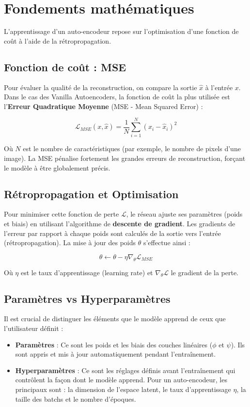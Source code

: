 \documentclass[11pt,a4paper]{report}
\begin{document}
\section{Fondements mathématiques}

L'apprentissage d'un auto-encodeur repose sur l'optimisation d'une fonction de coût à l'aide de la rétropropagation.

\subsection{Fonction de coût : MSE}
Pour évaluer la qualité de la reconstruction, on compare la sortie $\hat{x}$ à l'entrée $x$. Dans le cas des Vanilla Autoencoders, la fonction de coût la plus utilisée est l'\textbf{Erreur Quadratique Moyenne} (MSE - Mean Squared Error) :

\begin{equation} \label{eq:mse_def}
    \mathcal{L}_{MSE}(x, \hat{x}) = \frac{1}{N} \sum_{i=1}^{N} (x_i - \hat{x}_i)^2
\end{equation}

Où $N$ est le nombre de caractéristiques (par exemple, le nombre de pixels d'une image). La MSE pénalise fortement les grandes erreurs de reconstruction, forçant le modèle à être globalement précis.

\subsection{Rétropropagation et Optimisation}
Pour minimiser cette fonction de perte $\mathcal{L}$, le réseau ajuste ses paramètres (poids et biais) en utilisant l'algorithme de \textbf{descente de gradient}. Les gradients de l'erreur par rapport à chaque poids sont calculés de la sortie vers l'entrée (rétropropagation). La mise à jour des poids $\theta$ s'effectue ainsi :

\begin{equation}
    \theta \leftarrow \theta - \eta \nabla_\theta \mathcal{L}_{MSE}
\end{equation}

Où $\eta$ est le taux d'apprentissage (learning rate) et $\nabla_\theta \mathcal{L}$ le gradient de la perte.

\subsection{Paramètres vs Hyperparamètres}
Il est crucial de distinguer les éléments que le modèle apprend de ceux que l'utilisateur définit :
\begin{itemize}
    \item \textbf{Paramètres} : Ce sont les poids et les biais des couches linéaires ($\phi$ et $\psi$). Ils sont appris et mis à jour automatiquement pendant l'entraînement.
    \item \textbf{Hyperparamètres} : Ce sont les réglages définis avant l'entraînement qui contrôlent la façon dont le modèle apprend. Pour un auto-encodeur, les principaux sont : la dimension de l'espace latent, le taux d'apprentissage $\eta$, la taille des batchs et le nombre d'époques.
\end{itemize}
\end{document}
